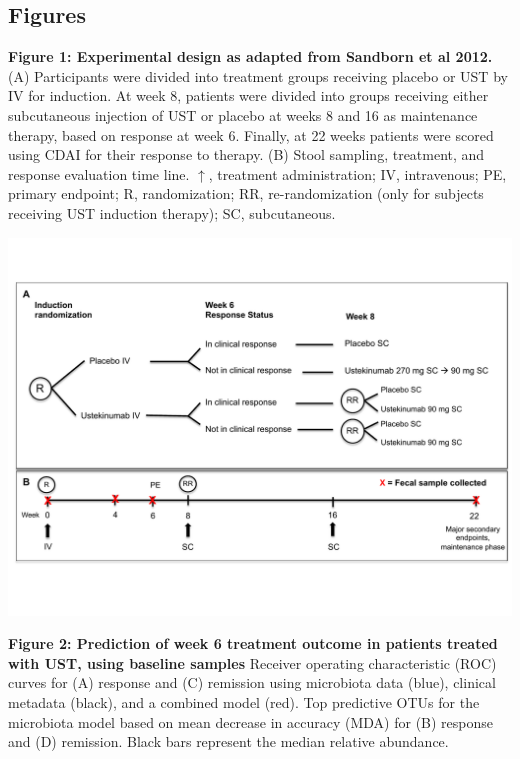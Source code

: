\documentclass[12pt,]{article}
\begin{document}
\newpage

\subsection{Figures}\label{figures}

\textbf{Figure 1: Experimental design as adapted from Sandborn et al
2012.} (A) Participants were divided into treatment groups receiving
placebo or UST by IV for induction. At week 8, patients were divided
into groups receiving either subcutaneous injection of UST or placebo at
weeks 8 and 16 as maintenance therapy, based on response at week 6.
Finally, at 22 weeks patients were scored using CDAI for their response
to therapy. (B) Stool sampling, treatment, and response evaluation time
line. \(\uparrow\), treatment administration; IV, intravenous; PE,
primary endpoint; R, randomization; RR, re-randomization (only for
subjects receiving UST induction therapy); SC, subcutaneous.

\includegraphics{figures/Figure1_expdesign.pdf}

\newpage

\textbf{Figure 2: Prediction of week 6 treatment outcome in patients
treated with UST, using baseline samples} Receiver operating
characteristic (ROC) curves for (A) response and (C) remission using
microbiota data (blue), clinical metadata (black), and a combined model
(red). Top predictive OTUs for the microbiota model based on mean
decrease in accuracy (MDA) for (B) response and (D) remission. Black
bars represent the median relative abundance.
\end{document}

